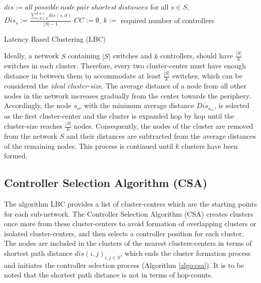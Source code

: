 \documentclass[journal]{IEEEtran}
\begin{document}
\begin{algorithm}
	\SetAlgoLined
	$dis := all~possible~node~pair~shortest~distances$\;
	for all $s\in S$, $\overline{Dis}_s := \frac{\sum_{s,d \in S}^{d \ne s}dis(s,d)}{|S|-1}$\;
	$CC := \emptyset$, $k :=$ required number of controllers\;
	\caption{Latency Based Clustering (LBC)} \label{algo:lbc}
\end{algorithm}
Ideally, a network $S$ containing $|S|$ switches and $k$ controllers, should have $\frac{|S|}{k}$ switches in each cluster. Therefore, every two cluster-center must have enough distance in between them to accommodate at least $\frac{|S|}{k}$ switches, which can be considered the \textit{ideal cluster-size}. The average distance of a node from all other nodes in the network increases gradually from the center towards the periphery. Accordingly, the node $s_{cc}$ with the minimum average distance $\overline{Dis_{s_{cc}}}$, is selected as the first cluster-center and the cluster is expanded hop by hop until the cluster-size reaches $\frac{|S|}{k}$ nodes. Consequently, the nodes of the cluster are removed from the network $S$ and their distances are subtracted from the average distances of the remaining nodes. This process is continued until $k$ clusters have been formed.

\subsection{Controller Selection Algorithm (CSA)} \label{csa}

The algorithm LBC provides a list of cluster-centers which are the starting points for each sub-network. The Controller Selection Algorithm (CSA) creates clusters once more from these cluster-centers to avoid formation of overlapping clusters or isolated cluster-centers, and then selects a controller position for each cluster. The nodes are included in the clusters of the nearest clusters-centers in terms of shortest path distance $dis(i,j)_{i,j \in S}$, which ends the cluster formation process and initiates the controller selection process (Algorithm \ref{algo:csa}). It is to be noted that the shortest path distance is not in terms of hop-counts.
\end{document}
